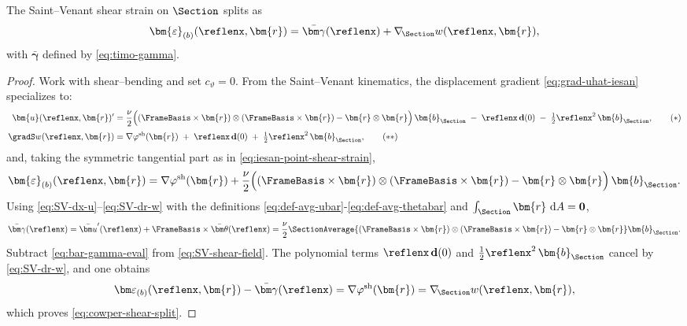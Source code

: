 \iffalse 
\begin{proposition}
The Saint–Venant shear strain on $\Section$ splits as
\begin{equation}
\bm{\varepsilon}_{(b)}(\reflenx,\bm{r})=\bar{\bm\gamma}(\reflenx)+\nabla_{\!\Section}w(\reflenx,\bm{r}),
\label{eq:cowper-shear-split}
\end{equation}
with $\bar{\bm{\gamma}}$ defined by \eqref{eq:timo-gamma}.
\end{proposition}
\begin{proof}
Work with shear–bending and set $c_{\vartheta}=0$. 
From the Saint–Venant kinematics, the displacement gradient \eqref{eq:grad-uhat-iesan} specializes to:
\begin{align}
\bm{u}(\reflenx,\bm{r})'
&=\frac{\nu}{2}\Big((\FrameBasis\times\bm{r})\otimes(\FrameBasis\times\bm{r})-\bm{r}\otimes\bm{r}\Big)\,\bm{b}_{\Section}
\;-\;\reflenx \,\mathbf d(0)\;-\;\tfrac{1}{2}\reflenx^2\,\bm{b}_{\Section},
\label{eq:SV-dx-u}\tag{$\ast$} \\[2pt]
\gradS w(\reflenx,\bm{r})
&=\nabla \varphi^{\rm sh}(\bm{r})\;+\;\reflenx\,\mathbf d(0)\;+\;\tfrac{1}{2}\reflenx^2\,\bm{b}_{\Section},
\label{eq:SV-dr-w}\tag{$\ast\ast$}
\end{align}
and, taking the symmetric tangential part as in \eqref{eq:iesan-point-shear-strain},
\begin{equation}
\label{eq:SV-shear-field}
\bm{\varepsilon}_{(b)}(\reflenx,\bm{r})
=
\nabla \varphi^{\rm sh}(\bm{r})
+\frac{\nu}{2}\Big((\FrameBasis\times\bm{r})\otimes(\FrameBasis\times\bm{r})-\bm{r}\otimes\bm{r}\Big)\,\bm{b}_{\Section}.
\end{equation}
%
Using \eqref{eq:SV-dx-u}–\eqref{eq:SV-dr-w} with the definitions \eqref{eq:def-avg-ubar}-\eqref{eq:def-avg-thetabar} and $\int_{\Section}\bm{r}\mathrm{~d}A = \mathbf{0}$,
\begin{equation}
\label{eq:bar-gamma-eval}
\bar{\bm\gamma}(\reflenx)
=\bar{\bm u}'(\reflenx)+\FrameBasis\times\bar{\bm\theta}(\reflenx)
=\frac{\nu}{2} \SectionAverage{(\FrameBasis\times\bm{r})\otimes(\FrameBasis\times\bm{r})-\bm{r}\otimes\bm{r}}\bm{b}_{\Section}.
\end{equation}
Subtract \eqref{eq:bar-gamma-eval} from \eqref{eq:SV-shear-field}. The polynomial terms $\reflenx\,\mathbf d(0)$ and $\tfrac{1}{2}\reflenx^2\,\bm{b}_{\Section}$ cancel by \eqref{eq:SV-dr-w}, and one obtains
\[
\bm\varepsilon_{(b)}(\reflenx,\bm{r})-\bar{\bm\gamma}(\reflenx)=\nabla \varphi^{\rm sh}(\bm{r})=\nabla_{\!\Section}w(\reflenx,\bm{r}),
\]
which proves \eqref{eq:cowper-shear-split}.
\end{proof}

